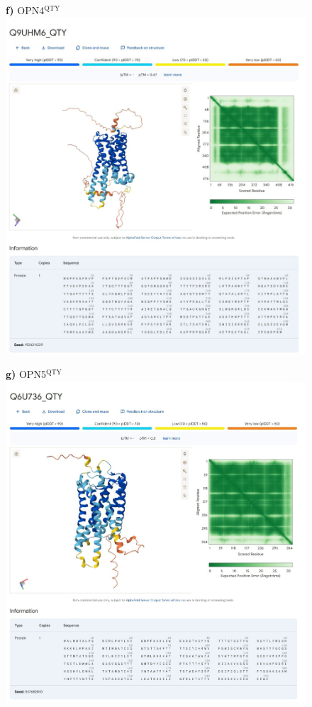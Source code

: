 \documentclass[fleqn,12pt]{supp}
\begin{document}
\newpage
\begin{figure}[H]
    \textbf{f)} OPN4$^{\textrm{QTY}}$ \\
    \includegraphics[width=\linewidth]{SuppFigures/af3 opn4 qty.jpg}
\end{figure}

\newpage
\begin{figure}[H]
    \textbf{g)} OPN5$^{\textrm{QTY}}$ \\
    \includegraphics[width=\linewidth]{SuppFigures/af3 opn5 qty.jpg}
\end{figure}
\end{document}
